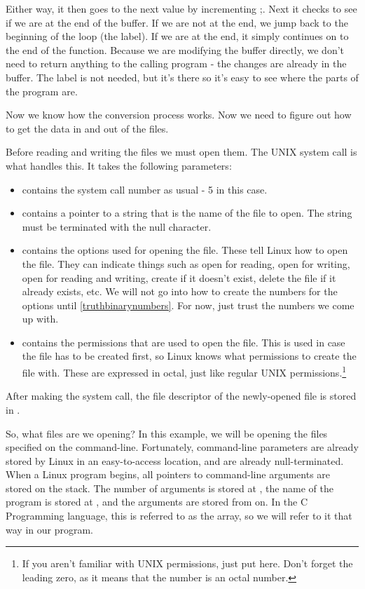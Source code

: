 Either way, it then goes to the next value by incrementing {\clBare};.  Next it checks to
see if we are at the end of the buffer.  If we are not at the end, we jump back to 
the beginning of the loop (the  label).  If we are
at the end, it simply continues on to the end of the function.  Because we are 
modifying the buffer directly, we don't need to return anything to the calling program - the
changes are already in the buffer.  The label 
is not needed, but it's there so it's easy to see where the parts of the program are.

Now we know how the conversion process works.  Now we need to figure out how
to get the data in and out of the files.

Before reading and writing the files we must open them. The UNIX 
system call is what handles this.  It takes
the following parameters:

\begin{itemize}\item {\eaxRegIdx} contains the system call number as usual - 5 in this case. 
\item {\ebxRegIdx} contains a pointer to a string that is the name of the file to open.  
The string must be terminated with the null character. 
\item {\ecxRegIdx} contains the options used for opening the file.
These tell Linux how to open the file.  They can indicate things such
as open for reading, open for writing, open for reading and writing, create
if it doesn't exist, delete the file if it already exists, etc.  We will
not go into how to create the numbers for the options until 
\autoref{truthbinarynumbers}.  For now, just trust the numbers we come
up with. 
\item {\edxRegIdx} contains the permissions
that are used to open the file.
This is used in case the file has to be created first, so Linux knows 
what permissions to create the file with.  These are expressed in octal,
just like regular UNIX permissions.\footnote{If you aren't familiar
with UNIX permissions, just put  here.  Don't
forget the leading zero, as it means that the number is an octal 
number.} 
\end{itemize}

After making the system call, the file descriptor of the newly-opened file
is stored in {\eaxRegIdx}.

So, what files are we opening?  In this example, we will be opening the
files specified on the 
command-line.  Fortunately, 
command-line parameters
are already stored by Linux
in an easy-to-access location, and are already null-terminated.  When 
a Linux program begins, all pointers to command-line arguments are
stored on the stack.  The number of arguments is stored at 
\icode{({\espBare})}, the name of the program is stored at
, and the arguments are stored from 
 on.  In the C Programming language, this
is referred to as the  array, so we will refer
to it that way in our program.

